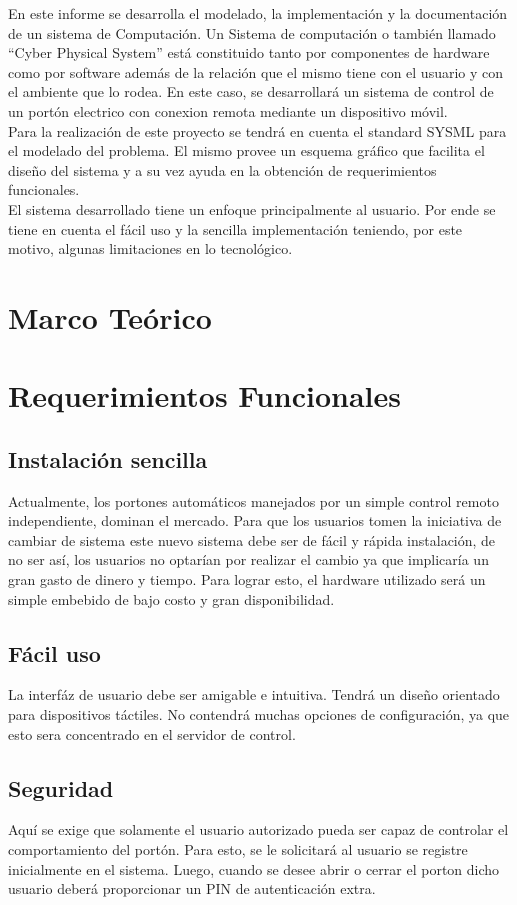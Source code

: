 \documentclass[16pt, article,notitlepage]{article}
\begin{document}
En este informe se desarrolla el modelado, la implementación y la documentación de un sistema de Computación. Un Sistema de computación o también llamado “Cyber Physical System” está constituido tanto por componentes de hardware como por software además de la relación que el mismo tiene con el usuario y con el ambiente que lo rodea. En este caso, se desarrollará un sistema de control de un portón electrico con conexion remota mediante un dispositivo móvil. \\
Para la realización de este proyecto se tendrá en cuenta el standard SYSML para el modelado del problema. El mismo provee un esquema gráfico que facilita el diseño del sistema y a su vez ayuda en la obtención de requerimientos funcionales. \\
El sistema desarrollado tiene un enfoque principalmente al usuario. Por ende se tiene en cuenta el fácil uso y la sencilla implementación teniendo, por este motivo, algunas limitaciones en lo tecnológico.

\section{Marco Teórico}
\section{Requerimientos Funcionales}
\subsection{Instalación sencilla}
Actualmente, los portones automáticos manejados por un simple control remoto independiente, dominan el mercado. Para que los usuarios tomen la iniciativa de cambiar de sistema este nuevo sistema debe ser de fácil y rápida instalación, de no ser así, los usuarios no optarían por realizar el cambio ya que implicaría un gran gasto de dinero y tiempo.
Para lograr esto, el hardware utilizado será un simple embebido de bajo costo y gran disponibilidad. 
\subsection{Fácil uso}
La interfáz de usuario debe ser amigable e intuitiva. Tendrá un diseño orientado para dispositivos táctiles. No contendrá muchas opciones de configuración, ya que esto sera concentrado en el servidor de control.
\subsection{Seguridad}
Aquí se exige que solamente el usuario autorizado pueda ser capaz de controlar el comportamiento del portón. Para esto, se le solicitará al usuario se registre inicialmente en el sistema. Luego, cuando se desee abrir o cerrar el porton dicho usuario deberá proporcionar un PIN de autenticación extra.
\end{document}
